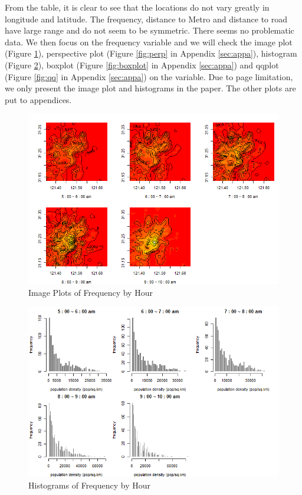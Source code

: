 \documentclass[hidelinks,12pt]{article}
\begin{document}
	From the table, it is clear to see that the locations do not vary greatly in longitude and latitude. The frequency, distance to Metro and distance to road have large range and do not seem to be symmetric. There seems no problematic data. We then focus on the frequency variable and we will check the image plot (Figure \ref{fig:image}), perspective plot (Figure \ref{fig:perp} in Appendix \ref{sec:appa}), histogram (Figure \ref{fig:hist}), boxplot (Figure \ref{fig:boxplot} in Appendix \ref{sec:appa}) and qqplot (Figure \ref{fig:qq} in Appendix \ref{sec:appa}) on the variable. Due to page limitation, we only present the image plot and histograms in the paper. The other plots are put to appendices.
	\begin{figure}[!ht]
		\includegraphics[width=\textwidth]{image.png}
		\caption{Image Plots of Frequency by Hour \label{fig:image}}
	\end{figure}
\FloatBarrier
	\begin{figure}[!ht]
		\includegraphics[width=\textwidth]{hist.png}
		\caption{Histograms of Frequency by Hour \label{fig:hist}}
	\end{figure}
\end{document}
